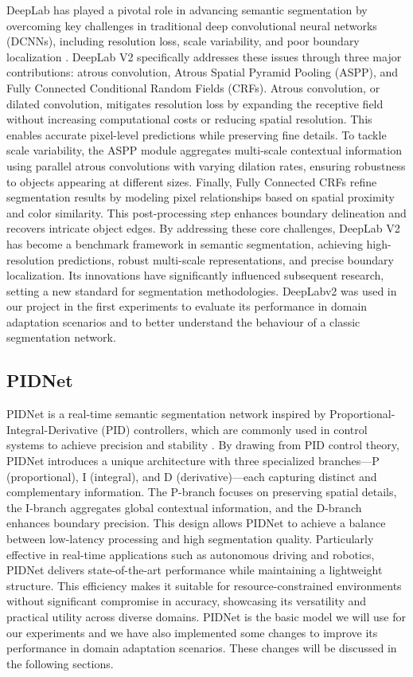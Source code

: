 \documentclass[10pt,twocolumn,letterpaper]{article}
\begin{document}
DeepLab has played a pivotal role in advancing semantic segmentation by overcoming key challenges in traditional deep convolutional neural networks (DCNNs), including resolution loss, scale variability, and poor boundary localization \cite{chen2017deeplab}. DeepLab V2 specifically addresses these issues through three major contributions: atrous convolution, Atrous Spatial Pyramid Pooling (ASPP), and Fully Connected Conditional Random Fields (CRFs).
Atrous convolution, or dilated convolution, mitigates resolution loss by expanding the receptive field without increasing computational costs or reducing spatial resolution. This enables accurate pixel-level predictions while preserving fine details. To tackle scale variability, the ASPP module aggregates multi-scale contextual information using parallel atrous convolutions with varying dilation rates, ensuring robustness to objects appearing at different sizes. Finally, Fully Connected CRFs refine segmentation results by modeling pixel relationships based on spatial proximity and color similarity. This post-processing step enhances boundary delineation and recovers intricate object edges.
By addressing these core challenges, DeepLab V2 has become a benchmark framework in semantic segmentation, achieving high-resolution predictions, robust multi-scale representations, and precise boundary localization. Its innovations have significantly influenced subsequent research, setting a new standard for segmentation methodologies.
DeepLabv2 was used in our project in the first experiments to evaluate its performance in domain adaptation scenarios and to better understand the behaviour of a classic segmentation network.

\subsection{PIDNet}

PIDNet is a real-time semantic segmentation network inspired by Proportional-Integral-Derivative (PID) controllers, which are commonly used in control systems to achieve precision and stability \cite{feng2021pidnet}. By drawing from PID control theory, PIDNet introduces a unique architecture with three specialized branches—P (proportional), I (integral), and D (derivative)—each capturing distinct and complementary information. The P-branch focuses on preserving spatial details, the I-branch aggregates global contextual information, and the D-branch enhances boundary precision. This design allows PIDNet to achieve a balance between low-latency processing and high segmentation quality. Particularly effective in real-time applications such as autonomous driving and robotics, PIDNet delivers state-of-the-art performance while maintaining a lightweight structure. This efficiency makes it suitable for resource-constrained environments without significant compromise in accuracy, showcasing its versatility and practical utility across diverse domains. PIDNet is the basic model we will use for our experiments and we have also implemented some changes to improve its performance in domain adaptation scenarios. These changes will be discussed in the following sections.
\end{document}
